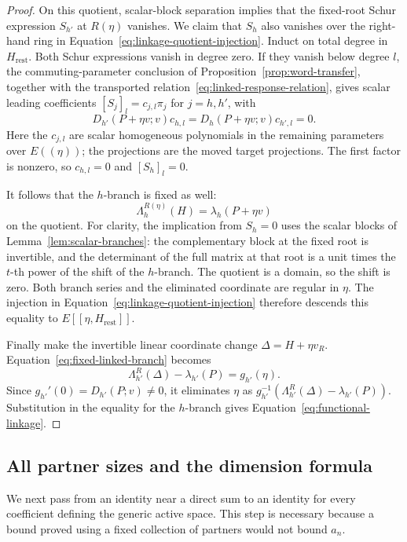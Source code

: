 \documentclass[11pt]{article}
\theoremstyle{definition}
\theoremstyle{remark}
\numberwithin{equation}{section}
\begin{document}
\begin{proof}
On this quotient, scalar-block separation implies that the fixed-root
Schur expression $S_{h'}$ at $R(\eta)$ vanishes.  We claim that $S_h$
also vanishes over the right-hand ring in
Equation~\eqref{eq:linkage-quotient-injection}.  Induct on total degree
in $H_{\mathrm{rest}}$.  Both Schur expressions vanish in degree zero.
If they vanish below degree $l$, the commuting-parameter conclusion of
Proposition~\ref{prop:word-transfer}, together with the transported
relation~\eqref{eq:linked-response-relation}, gives scalar leading
coefficients $[S_j]_l=c_{j,l}\pi_j$ for $j=h,h'$, with
\[
 D_{h'}(P+\eta v;v)c_{h,l}
   =D_h(P+\eta v;v)c_{h',l}=0.
\]
Here the $c_{j,l}$ are scalar homogeneous polynomials in the remaining
parameters over $E((\eta))$; the projections are the moved target
projections. The first factor is nonzero, so $c_{h,l}=0$ and
$[S_h]_l=0$.

It follows that the $h$-branch is fixed as well:
\[
 \Lambda_h^{R(\eta)}(H)=\lambda_h(P+\eta v)
\]
on the quotient.  For clarity, the implication from $S_h=0$ uses the
scalar blocks of Lemma~\ref{lem:scalar-branches}: the complementary
block at the fixed root is invertible, and the determinant of the full
matrix at that root is a unit times the $t$-th power of the shift of
the $h$-branch.  The quotient is a domain, so the shift is zero.
Both branch series and the eliminated coordinate are regular in
$\eta$.  The injection in
Equation~\eqref{eq:linkage-quotient-injection} therefore descends this
equality to $E[[\eta,H_{\mathrm{rest}}]]$.

Finally make the invertible linear coordinate change
$\Delta=H+\eta v_R$.  Equation~\eqref{eq:fixed-linked-branch} becomes
\[
 \Lambda_{h'}^R(\Delta)-\lambda_{h'}(P)=g_{h'}(\eta).
\]
Since $g_{h'}'(0)=D_{h'}(P;v)\neq0$, it eliminates $\eta$ as
$g_{h'}^{-1}(\Lambda_{h'}^R(\Delta)-\lambda_{h'}(P))$.
Substitution in the equality for the $h$-branch gives
Equation~\eqref{eq:functional-linkage}.
\end{proof}

\subsection{All partner sizes and the dimension formula}

We next pass from an identity near a direct sum to an identity for
every coefficient defining the generic active space.  This step is
necessary because a bound proved using a fixed collection of partners
would not bound $a_n$.
\end{document}
